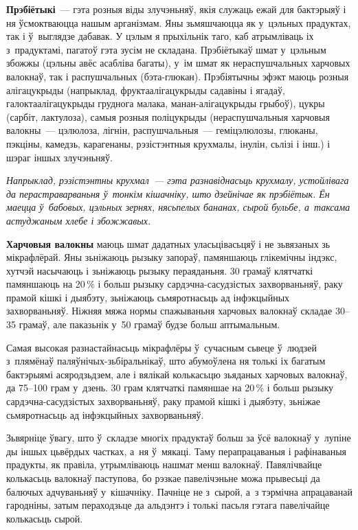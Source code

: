 \textbf{Прэбіётыкі}~--- гэта розныя віды злучэньняў, якія служаць ежай для бактэрыяў і ня ўсмоктваюцца нашым арганізмам. Яны зьмяшчаюцца як у~цэльных прадуктах, так і ў~выглядзе дабавак. У цэлым я прыхільнік таго, каб атрымліваць іх з~прадуктамі, пагатоў гэта зусім не складана. Прэбіётыкаў шмат у~цэльным збожжы (цэльны авёс асабліва багаты), у~ім шмат як нераспушчальных харчовых валокнаў, так і распушчальных (бэта-глюкан). Прэбіятычны эфэкт маюць розныя алігацукрыды (напрыклад, фруктаалігацукрыды садавіны і ягадаў, галоктаалігацукрыды груднога малака, манан-алігацукрыды грыбоў), цукры (сарбіт, лактулоза), самыя розныя поліцукрыды (нераспушчальныя харчовыя валокны~--- цэлюлоза, лігнін, распушчальныя~--- геміцэлюлозы, глюканы, пэкціны, камедзь, карагенаны, рэзістэнтныя крухмалы, інулін, сьлізі і інш.) і шэраг іншых злучэньняў.

\emph{Напрыклад, рэзістэнтны крухмал~--- гэта разнавіднасьць крухмалу, устойлівага да перастраварваньня ў~тонкім кішачніку, што дзейнічае як прэбіётык. Ён маецца ў~бабовых, цэльных зернях, нясьпелых бананах, сырой бульбе, а~таксама астуджаным хлебе і збожжавых.}

\textbf{Харчовыя валокны} маюць шмат дадатных уласьцівасьцяў і не зьвязаных зь мікрафлёрай. Яны зьніжаюць рызыку запораў, памяншаюць глікемічны індэкс, хутчэй насычаюць і зьніжаюць рызыку пераяданьня. 30 грамаў клятчаткі памяншаюць на 20\,\% і больш рызыку сардэчна-сасудзістых захворваньняў, раку прамой кішкі і дыябэту, зьніжаюць сьмяротнасьць ад інфэкцыйных захворваньняў. Ніжняя мяжа нормы спажываньня харчовых валокнаў складае 30--35 грамаў, але паказьнік у~50 грамаў будзе больш аптымальным.

Самая высокая разнастайнасьць мікрафлёры ў~сучасным сьвеце ў~людзей з~плямёнаў паляўнічых-зьбіральнікаў, што абумоўлена ня толькі іх багатым бактэрыямі асяродзьдзем, але і вялікай колькасьцю зьяданых харчовых валокнаў, да 75--100 грам у~дзень. 30 грам клятчаткі памяншае на 20\,\% і больш рызыку сардэчна-сасудзістых захворваньняў, раку прамой кішкі і дыябэту, зьніжае сьмяротнасьць ад інфэкцыйных захворваньняў.

Зьвярніце ўвагу, што ў~складзе многіх прадуктаў больш за ўсё валокнаў у~лупіне ды іншых цьвёрдых частках, а~ня ў~мякаці. Таму перапрацаваныя і рафінаваныя прадукты, як правіла, утрымліваюць нашмат менш валокнаў. Павялічвайце колькасьць валокнаў паступова, бо рэзкае павелічэньне можа прывесьці да балючых адчуваньняў у~кішачніку. Пачніце не з~сырой, а~з тэрмічна апрацаванай гародніны, затым пераходзьце да альдэнтэ і толькі пасьля гэтага павелічайце колькасьць сырой.


